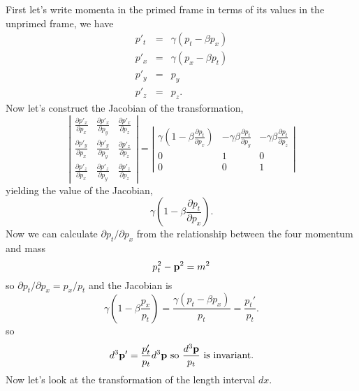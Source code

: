 First let's write momenta in the primed frame in terms of its values
in the unprimed frame, we have
\begin{eqnarray}
p'_t &=& \gamma \left ( p_t - \beta p_x \right ) \\
p'_x &=& \gamma \left ( p_x - \beta p_t \right ) \\
p'_y &=& p_y \\
p'_z &=& p_z .
\end{eqnarray}
Now let's construct the Jacobian of the transformation,
\begin{equation}
\left | \begin{array}{ccc}
\frac{\partial  p'_x}{\partial p_x} & \frac{\partial  p'_x}{\partial p_y} & \frac{\partial 
p'_x }{ \partial p_z} \\
\frac{\partial  p'_y}{\partial p_x} & \frac{\partial  p'_y}{\partial p_y} & \frac{\partial 
p'_z }{ \partial p_z} \\
\frac{\partial  p'_z}{\partial p_x} & \frac{\partial  p'_z}{\partial p_y} & \frac{\partial 
p'_z }{ \partial p_z }
  \end{array}
\right | =
\left | \begin{array}{ccc}
\gamma \left ( 1 - \beta \frac{\partial  p_t}{\partial p_x } \right ) & -\gamma
\beta \frac{\partial  p_t}{\partial p_y} & -\gamma \beta \frac{\partial 
p_t }{ \partial p_z} \\
0  & 1 & 0 \\
0 & 0 & 1 
  \end{array}
\right |
\end{equation}
yielding the value of the Jacobian,
\begin{equation}
\gamma \left ( 1 - \beta \frac{\partial p_t}{\partial p_x} \right ).
\end{equation}
Now we can calculate $\partial p_t/\partial p_x$ from the relationship
between the four momentum and mass
\begin{equation}
p_t^2 - {\bf p}^2 = m^2
\end{equation}
so $\partial p_t/\partial p_x=p_x/p_t$ and the Jacobian is
\begin{equation}
\gamma \left ( 1 - \beta \frac{p_x}{p_t} \right ) =
\frac{\gamma \left ( p_t - \beta p_x \right )}{p_t} = \frac{p_t'}{p_t}.
\end{equation}
so 
\begin{equation}
d^3 {\bf p}' = \frac{p_t'}{p_t} d^3 {\bf p} ~\textrm{so}~
\frac{ d^3 {\bf p}}{p_t} ~\textrm{is invariant.}
\end{equation}
Now let's look at the transformation of the length interval $dx$.
